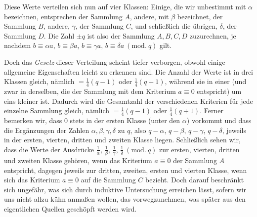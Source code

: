 Diese Werte verteilen sich nun auf vier Klassen: Einige, die wir unbestimmt mit $\alpha$ bezeichnen, entsprechen der Sammlung $A$, andere, mit $\beta$ bezeichnet, der Sammlung $B$, andere, $\gamma$, der Sammlung $C$, und schließlich die übrigen, $\delta$, der Sammlung $D$. Die Zahl $\pm q$ ist also der Sammlung $A,B,C,D$ zuzurechnen, je nachdem $b\equiv\alpha a$, $b\equiv\beta a$, $b\equiv\gamma a$, $b\equiv\delta a\ (\mathrm{mod.}\ q)$ gilt.

Doch das \emph{Gesetz} dieser Verteilung scheint tiefer verborgen, obwohl einige allgemeine Eigenschaften leicht zu erkennen sind. Die Anzahl der Werte ist in drei Klassen gleich, nämlich $=\frac14(q-1)$ oder $\frac14(q+1)$, während sie in einer (und zwar in derselben, die der Sammlung mit dem Kriterium $a\equiv0$ entspricht) um eins kleiner ist. Dadurch wird die Gesamtzahl der verschiedenen Kriterien für jede einzelne Sammlung gleich, nämlich $=\frac14(q-1)$ oder $\frac14(q+1)$. Ferner bemerken wir, dass $0$ stets in der ersten Klasse (unter den $\alpha$) vorkommt und dass die Ergänzungen der Zahlen $\alpha,\beta,\gamma,\delta$ zu $q$, also $q-\alpha$, $q-\beta$, $q-\gamma$, $q-\delta$, jeweils in der ersten, vierten, dritten und zweiten Klasse liegen. Schließlich sehen wir, dass die Werte der Ausdrücke $\frac1\alpha$, $\frac1\beta$, $\frac1\gamma$, $\frac1\delta\ (\mathrm{mod.}\ q)$ zur ersten, vierten, dritten und zweiten Klasse gehören, wenn das Kriterium $a\equiv0$ der Sammlung $A$ entspricht, dagegen jeweils zur dritten, zweiten, ersten und vierten Klasse, wenn sich das Kriterium $a\equiv0$ auf die Sammlung $C$ bezieht. Doch darauf beschränkt sich ungefähr, was sich durch induktive Untersuchung erreichen lässt, sofern wir uns nicht allzu kühn anmaßen wollen, das vorwegzunehmen, was später aus den eigentlichen Quellen geschöpft werden wird.
